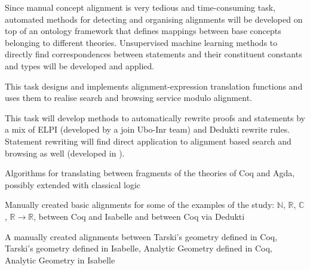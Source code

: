 \begin{workpackage}
\begin{tasklist}
  \begin{task}[id=aligntheories,title=Automated proof engineering,shorttitle=Autom.,lead=Imt,ImtRM=6,InnRM=6,SacRM=6,wphases=6-24!1]
    Since manual concept alignment is very tedious and time-consuming
    task, automated methods for detecting and organising alignments
    will be developed on top of an ontology framework that defines
    mappings between base concepts belonging to different
    theories. Unsupervised machine learning methods to directly find
    correspondences between statements and their constituent constants
    and types will be developed and applied.
  \end{task}

  \begin{task}[id=alignsearch,title=Alignment-Based Search,shorttitle=Search,lead=Fau,FauRM=11,wphases=5-48!.33]
    This task designs and implements alignment-expression translation
    functions and uses them to realise search and browsing service
    modulo alignment.
  \end{task}
  
  \begin{task}[id=alignproofs,title=Proof-Rewriting,shorttitle=Rewr.,lead=Bol,BolRM=13,InrRM=6,wphases=36-48!1.6]
    This task will develop methods to automatically rewrite proofs and
    statements by a mix of ELPI (developed by a join Ubo-Inr team) and
    Dedukti rewrite rules. Statement rewriting will find direct
    application to alignment based search and browsing as well
    (developed in ).
  \end{task}
\end{tasklist}

\begin{wpdelivs}
  \begin{wpdeliv}[due=24,id=prooftheoretical,dissem=PU,nature=DEM,lead=Lee,task=alignlogic]{Algorithms for translating between fragments of the theories of Coq and Agda, possibly extended with classical logic}\end{wpdeliv}

  \begin{wpdeliv}[due=24,id=aligningnumbers,dissem=PU,nature=DEM,lead=Str,task=aligncasestudies]{Manually created basic alignments for some of the examples of the study: $\mathbb{N}$, $\mathbb{R}$, $\mathbb{C}$, $\mathbb{R} \rightarrow \mathbb{R}$, between Coq and Isabelle and between Coq via Dedukti}\end{wpdeliv}
  
  \begin{wpdeliv}[due=36,id=aligninggeometries,dissem=PU,nature=DEM,lead=Bel,task=aligncasestudies]{A manually created alignments between Tarski's geometry defined in Coq, Tarski's geometry defined in Isabelle, Analytic Geometry defined in Coq, Analytic Geometry in Isabelle}\end{wpdeliv}
  

\end{wpdelivs}
\end{workpackage}
